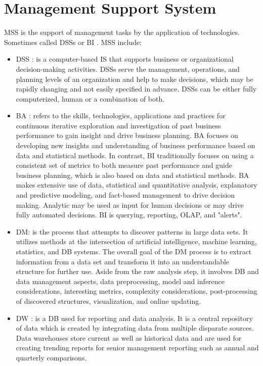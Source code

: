 \documentclass[12pt,a4paper,final,twoside,onecolumn,titlepage]{book}
\begin{document}
\section{Management Support System}
\gls{MSS} is the support of management tasks by the application of technologies. Sometimes called \gls{DSS}s or \gls{BI} \cite{MNAS02}. \gls{MSS} include:
\begin{itemize}
\item \gls{DSS} \cite{Wiki-DSS}: is a computer-based \gls{IS} that supports business or organizational decision-making activities. \gls{DSS}s serve the management, operations, and planning levels of an organization and help to make decisions, which may be rapidly changing and not easily specified in advance. \gls{DSS}s can be either fully computerized, human or a combination of both.
\item \gls{BA} \cite{Wiki-BA}: refers to the skills, technologies, applications and practices for continuous iterative exploration and investigation of past business performance to gain insight and drive business planning. \gls{BA} focuses on developing new insights and understanding of business performance based on data and statistical methods. In contrast, \gls{BI} traditionally focuses on using a consistent set of metrics to both measure past performance and guide business planning, which is also based on data and statistical methods.
\gls{BA} makes extensive use of data, statistical and quantitative analysis, explanatory and predictive modeling, and fact-based management to drive decision making. Analytic may be used as input for human decisions or may drive fully automated decisions. \gls{BI} is querying, reporting, \gls{OLAP}, and "alerts".
\item \gls{DM}\cite{Wiki-DM}: is the process that attempts to discover patterns in large data sets. It utilizes methods at the intersection of artificial intelligence, machine learning, statistics, and \gls{DB} systems. The overall goal of the \gls{DM} process is to extract information from a data set and transform it into an understandable structure for further use. Aside from the raw analysis step, it involves \gls{DB} and data management aspects, data preprocessing, model and inference considerations, interesting metrics, complexity considerations, post-processing of discovered structures, visualization, and online updating.
\item \gls{DW} \cite{Wiki-DW}: is a \gls{DB} used for reporting and data analysis. It is a central repository of data which is created by integrating data from multiple disparate sources. Data warehouses store current as well as historical data and are used for creating trending reports for senior management reporting such as annual and quarterly comparisons.

\end{itemize}
\end{document}
